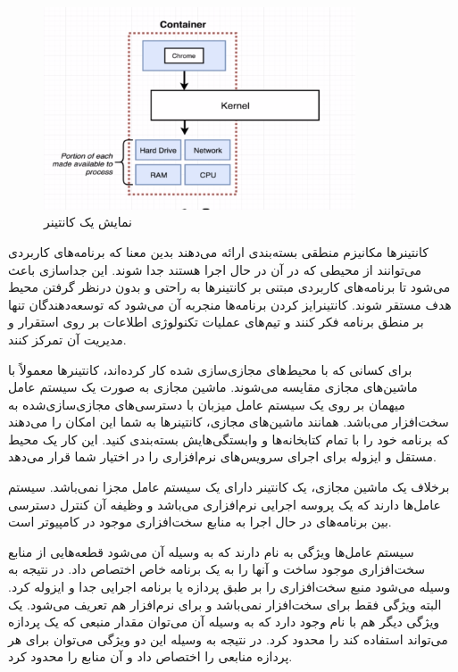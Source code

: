 \begin{figure}[!h]
	\centering
	\includegraphics[height=6cm]{fig2-1}
	\caption{نمایش یک کانتینر}
	\label{تصویر 2-1}
\end{figure}

کانتینرها مکانیزم منطقی بسته‌بندی ارائه می‌دهند بدین معنا که برنامه‌های کاربردی می‌توانند از محیطی که در آن در حال اجرا هستند جدا شوند. این جداسازی باعث می‌شود تا برنامه‌های کاربردی مبتنی بر کانتینرها به راحتی و بدون درنظر گرفتن محیط هدف مستقر شوند. کانتینرایز کردن برنامه‌ها منجربه آن می‌شود که توسعه‌دهندگان تنها بر منطق برنامه فکر کنند و تیم‌های عملیات تکنولوژی اطلاعات بر روی استقرار و مدیریت آن تمرکز کنند.

برای کسانی که با محیط‌های مجازی‌سازی شده کار کرده‌اند، کانتینرها معمولاً با ماشین‌های مجازی مقایسه می‌شوند. ماشین مجازی به صورت یک سیستم عامل میهمان بر روی یک سیستم عامل میزبان با دسترسی‌های مجازی‌سازی‌شده به سخت‌افزار می‌باشد. همانند ماشین‌های مجازی، کانتینرها به شما این امکان را می‌دهند که برنامه خود را با تمام کتابخانه‌ها و وابستگی‌هایش بسته‌بندی کنید. این کار یک محیط مستقل و ایزوله برای اجرای سرویس‌های نرم‌افزاری را در اختیار شما قرار می‌دهد. 

برخلاف یک ماشین مجازی، یک کانتینر دارای یک سیستم عامل مجزا نمی‌باشد. سیستم عامل‌ها
دارند که یک پروسه اجرایی نرم‌افزاری می‌باشد و وظیفه آن کنترل دسترسی بین برنامه‌های در حال اجرا به منابع سخت‌افزاری موجود در کامپیوتر است.

سیستم عامل‌ها ویژگی به نام
دارند که به وسیله آن می‌شود قطعه‌هایی از منابع سخت‌افزاری موجود ساخت و آنها را به یک برنامه خاص اختصاص داد. در نتیجه به وسیله
می‌شود منبع سخت‌افزاری را بر طبق  پردازه یا برنامه اجرایی جدا و ایزوله کرد. البته ویژگی
فقط برای سخت‌افزار نمی‌باشد و برای نرم‌افزار هم تعریف می‌شود. یک ویژگی دیگر هم با نام
وجود دارد که به وسیله آن می‌توان مقدار منبعی که یک پردازه می‌تواند استفاده کند را محدود کرد. در نتیجه به وسیله این دو ویژگی می‌توان برای هر پردازه منابعی را اختصاص داد و آن منابع را محدود کرد. 

